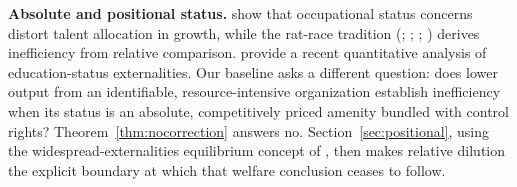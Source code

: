 \documentclass[12pt,letterpaper]{article}
\theoremstyle{definition}
\begin{document}
\textbf{Absolute and positional status.}
\citet{fershtmanmurphyweiss1996} show that occupational status concerns distort talent
allocation in growth, while the rat-race tradition
(\citealt{akerlof1976caste}; \citealt{hopkinskornienko2004};
\citealt{frank1985demand}; \citealt{hirsch1976social}) derives inefficiency from relative
comparison.
\citet{kimtertiltyum2024} provide a recent quantitative analysis of education-status
externalities.
Our baseline asks a different question: does lower output from an identifiable,
resource-intensive organization establish inefficiency when its status is an absolute,
competitively priced amenity bundled with control rights?
Theorem~\ref{thm:nocorrection} answers no.
Section~\ref{sec:positional}, using the widespread-externalities equilibrium concept of
\citet{noguchizame2006externalities}, then makes relative dilution the explicit boundary
at which that welfare conclusion ceases to follow.
\end{document}
